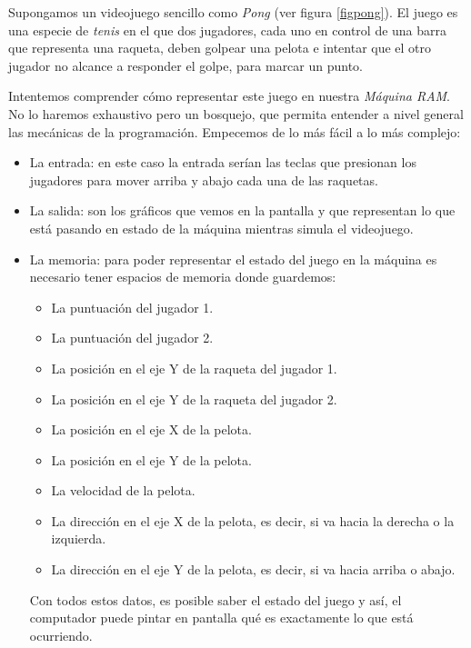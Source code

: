 Supongamos un videojuego sencillo como \emph{Pong} (ver figura \ref{figpong}). El juego es una especie de \emph{tenis} en el que dos jugadores, cada uno en control de una barra que representa una raqueta, deben golpear una pelota e intentar que el otro jugador no alcance a responder el golpe, para marcar un punto. 

Intentemos comprender cómo representar este juego en nuestra \emph{Máquina RAM}. No lo haremos exhaustivo pero un bosquejo, que permita entender a nivel general las mecánicas de la programación. Empecemos de lo más fácil a lo más complejo:

\begin{itemize}

	
	\item La entrada: en este caso la entrada serían las teclas que presionan los jugadores para mover arriba y abajo cada una de las raquetas.
	
	\item La salida: son los gráficos que vemos en la pantalla y que representan lo que está pasando en estado de la máquina mientras simula el videojuego.
	
	\item La memoria: para poder representar el estado del juego en la máquina es necesario tener espacios de memoria donde guardemos:
	
	\begin{itemize}
		\item La puntuación del jugador 1.
		\item La puntuación del jugador 2.
		\item La posición en el eje Y de la raqueta del jugador 1.
		\item La posición en el eje Y de la raqueta del jugador 2.
		\item La posición en el eje X de la pelota.
		\item La posición en el eje Y de la pelota.
		\item La velocidad de la pelota.
		\item La dirección en el eje X de la pelota, es decir, si va hacia la derecha o la izquierda.
		\item La dirección en el eje Y de la pelota, es decir, si va hacia arriba o abajo.
	\end{itemize}

	Con todos estos datos, es posible saber el estado del juego y así, el computador puede pintar en pantalla qué es exactamente lo que está ocurriendo.
	

\end{itemize}
